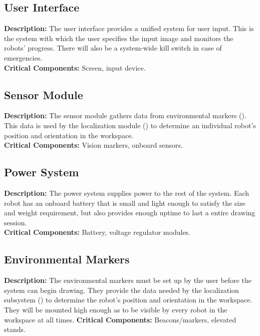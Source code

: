 \subsection{User Interface}
\label{sec:subsystem_ui}
\textbf{Description:} The user interface provides a unified system for user input. This is the system with which the user specifies the input image and monitors the robots' progress. There will also be a system-wide kill switch in case of emergencies.\\
\textbf{Critical Components:} Screen, input device.\\

\subsection{Sensor Module}
\label{sec:subsystem_sensors}
\textbf{Description:} The sensor module gathers data from environmental markers (). This data is used by the localization module () to determine an individual robot's position and orientation in the workspace.\\
\textbf{Critical Components:} Vision markers, onboard sensors.\\

\subsection{Power System}
\label{sec:subsystem_power}
\textbf{Description:} The power system supplies power to the rest of the system. Each robot has an onboard battery that is small and light enough to satisfy the size and weight requirement, but also provides enough uptime to last a entire drawing session.\\
\textbf{Critical Components:} Battery, voltage regulator modules.\\

\subsection{Environmental Markers}
\label{sec:subsystem_markers}
\textbf{Description:} The environmental markers must be set up by the user before the system can begin drawing. They provide the data needed by the localization subsystem () to determine the robot's position and orientation in the workspace. They will be mounted high enough as to be visible by every robot in the workspace at all times.
\textbf{Critical Components:} Beacons/markers, elevated stands.